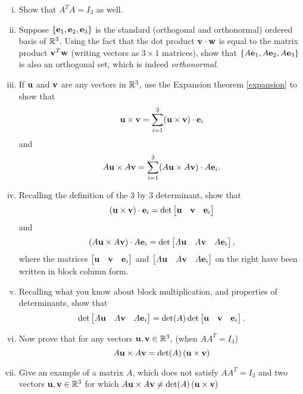 \begin{prob}
\begin{enumerate}[a)]
\begin{enumerate}[i)]
\item Show that $A^TA=I_3$ as well.
\medskip
%
\item Suppose $\{\mathbf{e}_1, \mathbf{e}_2, \mathbf{e}_3 \}$ is the standard (orthogonal and orthonormal) ordered basis of $\mathbb{R}^3$. Using the fact that the dot product $\mathbf{v}\cdot \mathbf{w}$ is equal to the matrix product $\mathbf{v}^T \mathbf{w}$ (writing vectors as $3 \times 1 $ matrices), show that $\{A\mathbf{e}_1, A\mathbf{e}_2, A\mathbf{e}_3 \}$ is also an orthogonal set, which is indeed {\it orthonormal.}
\medskip
%
\item If $\mathbf{u}$ and $\mathbf{v}$ are any vectors in $\mathbb{R}^3$, use the Expansion theorem \ref{expansion} to show that $$\mathbf{u} \times \mathbf{v}=  \displaystyle \sum_{i=1}^3 (\mathbf{u} \times \mathbf{v})\cdot \mathbf{e}_i$$ and $$A\mathbf{u} \times A\mathbf{v}= \displaystyle\sum_{i=1}^3 (A\mathbf{u} \times A\mathbf{v})\cdot A\mathbf{e}_i.$$
\medskip
%
\item Recalling the definition of the 3 by 3 determinant, show that $$(\uu \times \vv)\cdot \ee_i=\det\bmatrix \uu&\vv&\ee_i\endbmatrix$$ and   $$(A\uu \times A\vv)\cdot A\ee_i=\det\bmatrix A\uu&A\vv&A\ee_i\endbmatrix,$$ where the matrices $\bmatrix \uu&\vv&\ee_i\endbmatrix$ and $ \bmatrix A\uu&A\vv&A\ee_i\endbmatrix$ on the right have been written in block column form.
\medskip
%
\item Recalling what you know about block multiplication, and properties of determinants, show that $$\det\bmatrix A\uu&A\vv&A\ee_i\endbmatrix=\det(A)\det \bmatrix  \uu& \vv& \ee_i\endbmatrix.$$
\medskip
%
\item Now prove that  for any vectors $\mathbf{u}, \mathbf{v} \in \mathbb{R}^3$, (when $AA^T=I_3$) $$A\mathbf{u} \times A\mathbf{v} =\det(A) \, (\mathbf{u}\times \mathbf{v})$$
\medskip
%
\item Give an example of a matrix $A$, which does not satisfy $AA^T=I_3$ and two vectors $\mathbf{u},\mathbf{v} \in \mathbb{R}^3$ for which $A\mathbf{u} \times A\mathbf{v} \not=\det(A) \, (\mathbf{u}\times \mathbf{v})$
\medskip
%

\end{enumerate}

\end{enumerate}
\end{prob}

